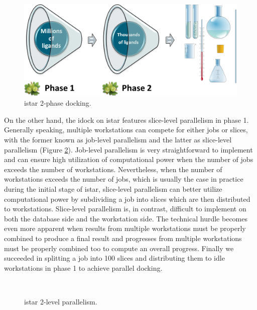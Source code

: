 \begin{figure}
\centering
\includegraphics[width=\linewidth]{istar/2PhaseDocking.png}
\caption{istar 2-phase docking.}
\label{istar:2PhaseDocking}
\end{figure}

On the other hand, the idock on istar features slice-level parallelism in phase 1. Generally speaking, multiple workstations can compete for either jobs or slices, with the former known as job-level parallelism and the latter as slice-level parallelism (Figure \ref{istar:2LevelParallelism}). Job-level parallelism is very straightforward to implement and can ensure high utilization of computational power when the number of jobs exceeds the number of workstations. Nevertheless, when the number of workstations exceeds the number of jobs, which is usually the case in practice during the initial stage of istar, slice-level parallelism can better utilize computational power by subdividing a job into slices which are then distributed to workstations. Slice-level parallelism is, in contrast, difficult to implement on both the database side and the workstation side. The technical hurdle becomes even more apparent when results from multiple workstations must be properly combined to produce a final result and progresses from multiple workstations must be properly combined too to compute an overall progress. Finally we succeeded in splitting a job into 100 slices and distributing them to idle workstations in phase 1 to achieve parallel docking.

\begin{figure}
\centering
{}
\\
\caption{istar 2-level parallelism.}
\label{istar:2LevelParallelism}
\end{figure}

